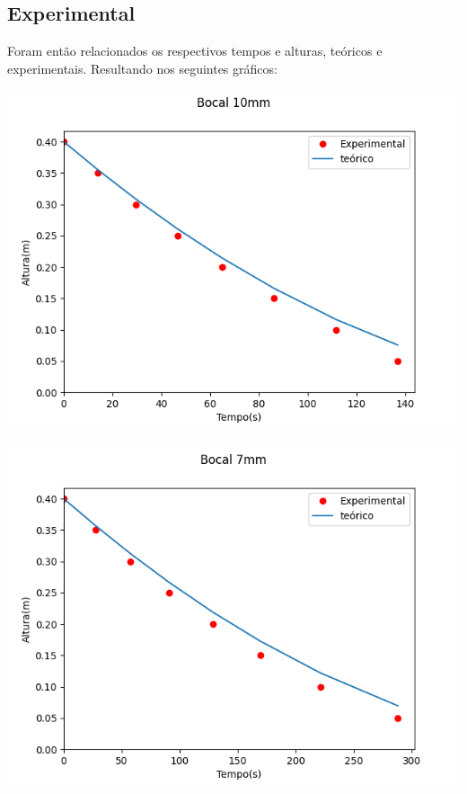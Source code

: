 \documentclass[12pt]{article}
\begin{document}
\subsection{Experimental}
\tab Foram então relacionados os respectivos tempos e alturas, teóricos e experimentais. Resultando nos seguintes gráficos:
\begin{center}

    \includegraphics{bocal10.png}

    \includegraphics{bocal7.png}


\end{center}
\end{document}
